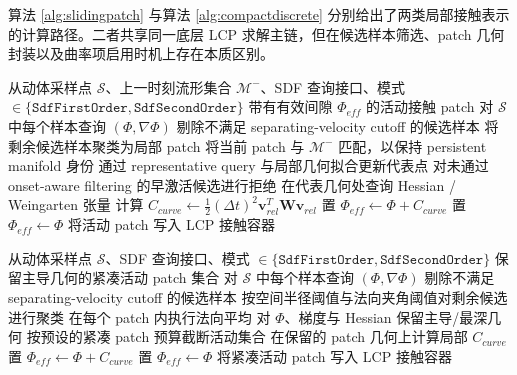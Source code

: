 算法 \ref{alg:slidingpatch} 与算法 \ref{alg:compactdiscrete} 分别给出了两类局部接触表示的计算路径。二者共享同一底层 LCP 求解主链，但在候选样本筛选、patch 几何封装以及曲率项启用时机上存在本质区别。

\begin{algorithm}[htbp]
\caption{面向光滑连续接触的 \texttt{SlidingPatch} 流程}
\label{alg:slidingpatch}
\begin{algorithmic}[1]
\Require 从动体采样点 $\mathcal{S}$、上一时刻流形集合 $\mathcal{M}^{-}$、SDF 查询接口、模式 $\in \{\texttt{SdfFirstOrder},\texttt{SdfSecondOrder}\}$
\Ensure 带有有效间隙 $\Phi_{eff}$ 的活动接触 patch
\State 对 $\mathcal{S}$ 中每个样本查询 $(\Phi,\nabla \Phi)$
\State 剔除不满足 separating-velocity cutoff 的候选样本
\State 将剩余候选样本聚类为局部 patch
\State 将当前 patch 与 $\mathcal{M}^{-}$ 匹配，以保持 persistent manifold 身份
\State 通过 representative query 与局部几何拟合更新代表点
\State 对未通过 onset-aware filtering 的早激活候选进行拒绝
    \State 在代表几何处查询 Hessian / Weingarten 张量
    \State 计算 $C_{curve} \gets \frac{1}{2}(\Delta t)^2 \mathbf{v}_{rel}^{T}\mathbf{W}\mathbf{v}_{rel}$
    \State 置 $\Phi_{eff} \gets \Phi + C_{curve}$
\Else
    \State 置 $\Phi_{eff} \gets \Phi$
\EndIf
\State 将活动 patch 写入 LCP 接触容器
\end{algorithmic}
\end{algorithm}

\begin{algorithm}[htbp]
\caption{面向紧凑或奇异接触的 \texttt{CompactDiscrete} 流程}
\label{alg:compactdiscrete}
\begin{algorithmic}[1]
\Require 从动体采样点 $\mathcal{S}$、SDF 查询接口、模式 $\in \{\texttt{SdfFirstOrder},\texttt{SdfSecondOrder}\}$
\Ensure 保留主导几何的紧凑活动 patch 集合
\State 对 $\mathcal{S}$ 中每个样本查询 $(\Phi,\nabla \Phi)$
\State 剔除不满足 separating-velocity cutoff 的候选样本
\State 按空间半径阈值与法向夹角阈值对剩余候选进行聚类
\State 在每个 patch 内执行法向平均
\State 对 $\Phi$、梯度与 Hessian 保留主导/最深几何
\State 按预设的紧凑 patch 预算截断活动集合
    \State 在保留的 patch 几何上计算局部 $C_{curve}$
    \State 置 $\Phi_{eff} \gets \Phi + C_{curve}$
\Else
    \State 置 $\Phi_{eff} \gets \Phi$
\EndIf
\State 将紧凑活动 patch 写入 LCP 接触容器
\end{algorithmic}
\end{algorithm}
